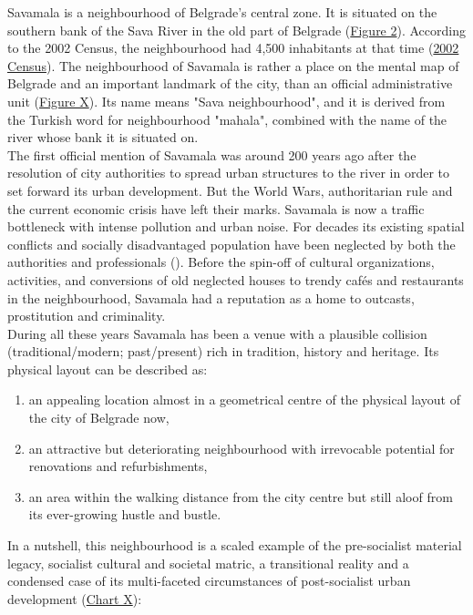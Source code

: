 \documentclass[11pt]{report}
\begin{document}
{{{{Savamala is a neighbourhood of Belgrade's central zone. It is situated on the southern bank of the Sava River in the old part of Belgrade (\href{Figure 2}{Figure 2}).
According to the 2002 Census, the neighbourhood had 4,500 inhabitants at that time (\href{ref}{2002 Census}).
The neighbourhood of Savamala is rather a place on the mental map of Belgrade and an important landmark of the city, than an official administrative unit  (\href{Figure Savamala boarders}{Figure X}). Its name means "Sava neighbourhood", and it is derived from the Turkish word for neighbourhood "mahala", combined with the name of the river whose bank it is situated on.
\\

The first official mention of Savamala was around 200 years ago after the resolution of city authorities to spread urban structures to the river in order to set forward its urban development. But the World Wars, authoritarian rule and the current economic crisis have left their marks. Savamala is now a traffic bottleneck with intense pollution and urban noise. For decades its existing spatial conflicts and socially disadvantaged population have been neglected by both the authorities and professionals (\href{Urban}{\citealt{kamenzid_urban_2013}}).
Before the spin-off of cultural organizations, activities, and conversions of old neglected houses to trendy cafés and restaurants in the neighbourhood, Savamala had a reputation as a home to outcasts, prostitution and criminality.
\\
During all these years Savamala has been a venue with a plausible collision (traditional/modern; past/present) rich in tradition, history and heritage.
Its physical layout can be described as:

\begin{enumerate}
\item an appealing location almost in a geometrical centre of the physical layout of the city of Belgrade now,
\item an attractive but deteriorating neighbourhood with irrevocable potential for renovations and refurbishments,
\item an area within the walking distance from the city centre but still aloof from its ever-growing hustle and bustle.
\end{enumerate} 

In a nutshell, this neighbourhood is a scaled example of the pre-socialist material legacy, socialist cultural and societal matric, a transitional reality and a condensed case of its multi-faceted circumstances of post-socialist urban development (\href{Chart Savamala Space-time}{Chart X}):

}}}}
\end{document}
